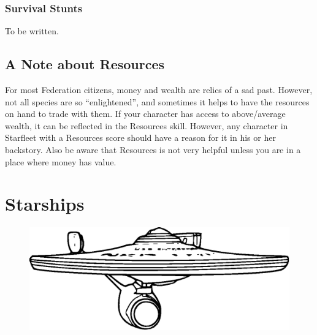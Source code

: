 \documentclass[12pt,titlepage,openany]{book}
\begin{document}
\begin{SkillActionList}



\end{SkillActionList}

\subsection*{Survival Stunts}\label{subsec:survival-stunts}

To be written.

\section{A Note about Resources}\label{sec:note-resources}

For most Federation citizens, money and wealth are relics of a sad past.
However, not all species are so ``enlightened'', and sometimes it helps to have
the resources on hand to trade with them. If your character has access to
above\-/average wealth, it can be reflected in the Resources skill. However,
any character in Starfleet with a Resources score should have a reason for it
in his or her backstory. Also be aware that Resources is not very helpful
unless you are in a place where money has value.



\chapter{Starships}\label{chap:starships}

\begin{figure}[H]
    \centering
    \includegraphics[width=0.8\linewidth]{img/ConstitutionClass.eps}
\end{figure}
\end{document}
